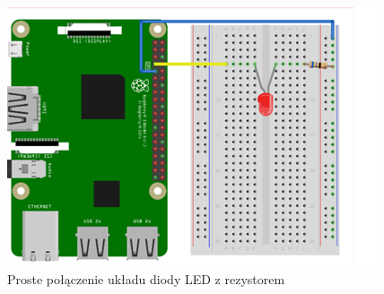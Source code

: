 \begin{figure}
	\centering
	\includegraphics[width=0.7\linewidth]{"obrazy/diodapołączenie"}
	\caption{Proste połączenie układu diody LED z rezystorem}
	\label{fig:4}
\end{figure}